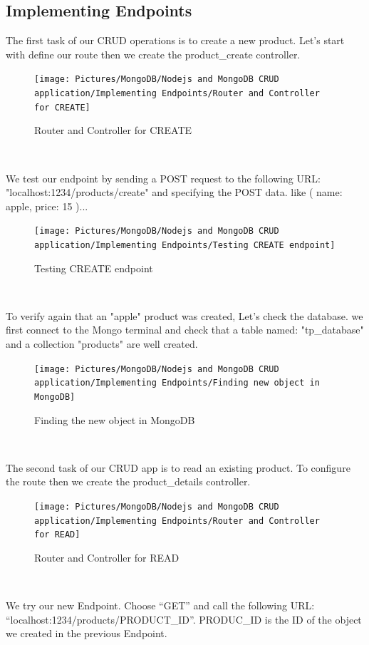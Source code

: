\begin{spacing}{1.2}
\section{Implementing Endpoints }
\par The first task of our CRUD operations is to create a new product. Let's start with
define our route then we create the product\_create controller.
\begin{figure}[!htb] 
\begin{center} 
\texttt{[image: Pictures/MongoDB/Nodejs and MongoDB CRUD  application/Implementing Endpoints/Router and Controller for CREATE]} 
\end{center} 
\caption{Router and Controller for CREATE} 
\end{figure}  \FloatBarrier
\\
\par We test our endpoint by sending a POST request to the following URL: "localhost:1234/products/create" and
specifying the POST data. like ( name: apple, price: 15 )...
\begin{figure}[!htb] 
\begin{center} 
\texttt{[image: Pictures/MongoDB/Nodejs and MongoDB CRUD  application/Implementing Endpoints/Testing CREATE endpoint]} 
\end{center} 
\caption{Testing CREATE endpoint} 
\end{figure}  \FloatBarrier
\\

\par To verify again that an "apple" product was created,
Let's check the database. we first connect to the Mongo terminal and check that a
table named: "tp\_database" and a collection "products" are well created.
\\
\begin{figure}[!htb] 
\begin{center} 
\texttt{[image: Pictures/MongoDB/Nodejs and MongoDB CRUD  application/Implementing Endpoints/Finding new object in MongoDB]} 
\end{center} 
\caption{Finding the new object in MongoDB} 
\end{figure}  \FloatBarrier
\\

\par The second task of our CRUD app is to read an existing product.
To configure the route then we create the product\_details controller.
\\
\begin{figure}[!htb] 
\begin{center} 
\texttt{[image: Pictures/MongoDB/Nodejs and MongoDB CRUD  application/Implementing Endpoints/Router and Controller for READ]} 
\end{center} 
\caption{Router and Controller for READ} 
\end{figure}  \FloatBarrier
\\\newpage
\par We try our new Endpoint. Choose “GET” and call the following URL:
“localhost:1234/products/PRODUCT\_ID”.
PRODUC\_ID is the ID of the object we created in the previous Endpoint.


\end{spacing}
